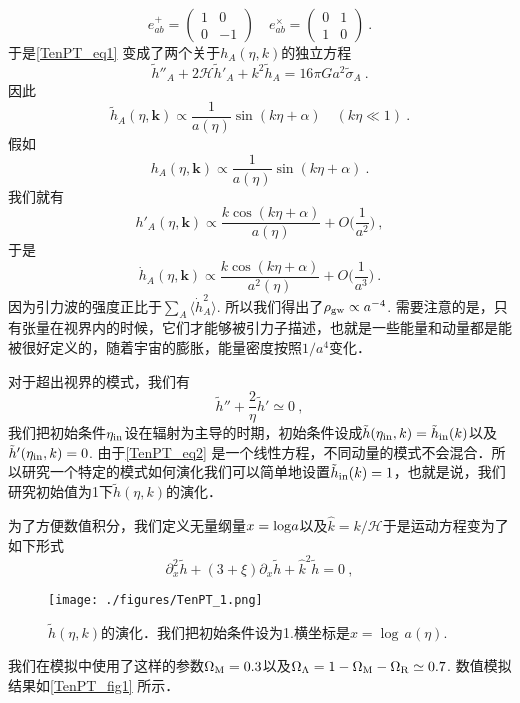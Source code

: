 \begin{equation}
e^+_{ab} = \begin{pmatrix}
1 & 0 \\
0 & -1 
\end{pmatrix} \quad 
e^\times_{ab} = \begin{pmatrix}
0 & 1 \\
1 & 0
\end{pmatrix}
~.
\end{equation}
于是\autoref{TenPT_eq1} 变成了两个关于$h_A(\eta,k)$的独立方程
\begin{equation}\label{TenPT_eq2}
\tilde h''_A + 2 \mathcal H \tilde h'_A + k^2\tilde h_A = 16 \pi G a^2 \tilde \sigma_A ~.
\end{equation}
因此
\begin{equation}
\tilde h_A(\eta,\mathbf k) \propto \frac{1}{a(\eta)} \sin(k\eta+\alpha)  \quad (k\eta \ll 1) ~.
\end{equation}
假如
\begin{equation}
h_A(\eta,\mathbf k) \propto \frac{1}{a(\eta)} \sin(k\eta+\alpha)   ~.
\end{equation}
我们就有
\begin{equation}
h'_A(\eta,\mathbf k) \propto \frac{k \cos(k\eta+\alpha)}{a(\eta)} + O \bigg( \frac{1}{a^2} \bigg) ~,
\end{equation}
于是
\begin{equation}
\dot h_A (\eta,\mathbf k) \propto \frac{k\cos(k\eta+\alpha)}{a^2 (\eta)} + O \bigg( \frac{1}{a^3} \bigg)~.
\end{equation}
因为引力波的强度正比于$\sum_A\langle \dot h_A^2 \rangle$. 所以我们得出了$\rho_{\rm gw} \propto a^{-4}$. 需要注意的是，只有张量在视界内的时候，它们才能够被引力子描述，也就是一些能量和动量都是能被很好定义的，随着宇宙的膨胀，能量密度按照$1/a^4$变化．

对于超出视界的模式，我们有
\begin{equation}
\tilde h'' + \frac{2}{\eta} \tilde h' \simeq 0 ~,
\end{equation}
我们把初始条件$\eta_{\rm in}$设在辐射为主导的时期，初始条件设成$\tilde h(\eta_{\rm in},k) = \tilde h_{\rm in} (k)$以及$\tilde h'(\eta_{\rm in},k) = 0$. 由于\autoref{TenPT_eq2} 是一个线性方程，不同动量的模式不会混合．所以研究一个特定的模式如何演化我们可以简单地设置$\tilde h_{\rm in}(k) = 1$，也就是说，我们研究初始值为1下$\tilde h({\eta,k})$的演化．

为了方便数值积分，我们定义无量纲量$x = {\rm log} a$以及$\hat k = k/\mathcal H$于是运动方程变为了如下形式
\begin{equation}
\partial^2_x \tilde h + (3+\xi) \partial_x \tilde h + \hat k^2 \tilde h = 0 ~,
\end{equation}
\begin{figure}[ht]
\centering
\texttt{[image: ./figures/TenPT\_1.png]}
\caption{$\tilde h(\eta,k)$的演化．我们把初始条件设为1.横坐标是$x = {\log} \, a (\eta).$} \label{TenPT_fig1}
\end{figure}
我们在模拟中使用了这样的参数$\Omega_{\rm M}=0.3$以及$\Omega_{\Lambda} = 1 - \Omega_{\rm M} - \Omega_{\rm R} \simeq 0.7$. 数值模拟结果如\autoref{TenPT_fig1} 所示．


